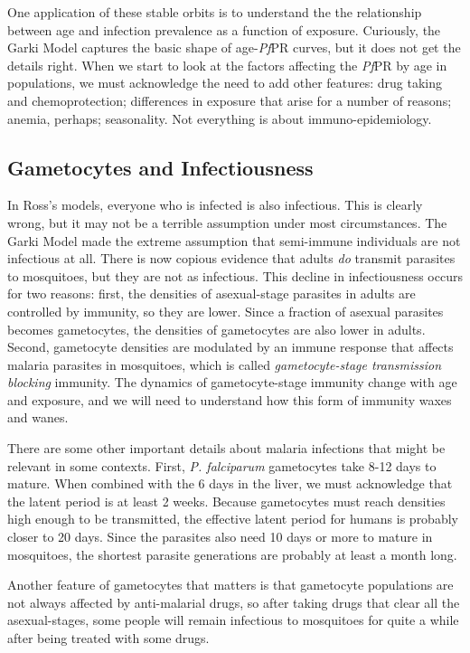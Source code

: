 \documentclass[
]{book}
\begin{document}
One application of these stable orbits is to understand the the relationship between age and infection prevalence as a function of exposure. Curiously, the Garki Model captures the basic shape of age-\emph{Pf}PR curves, but it does not get the details right. When we start to look at the factors affecting the \emph{Pf}PR by age in populations, we must acknowledge the need to add other features: drug taking and chemoprotection; differences in exposure that arise for a number of reasons; anemia, perhaps; seasonality. Not everything is about immuno-epidemiology.

\hypertarget{gametocytes-and-infectiousness}{%
\subsection{Gametocytes and Infectiousness}\label{gametocytes-and-infectiousness}}

In Ross's models, everyone who is infected is also infectious. This is clearly wrong, but it may not be a terrible assumption under most circumstances. The Garki Model made the extreme assumption that semi-immune individuals are not infectious at all. There is now copious evidence that adults \emph{do} transmit parasites to mosquitoes, but they are not as infectious. This decline in infectiousness occurs for two reasons: first, the densities of asexual-stage parasites in adults are controlled by immunity, so they are lower. Since a fraction of asexual parasites becomes gametocytes, the densities of gametocytes are also lower in adults. Second, gametocyte densities are modulated by an immune response that affects malaria parasites in mosquitoes, which is called \emph{gametocyte-stage transmission blocking} immunity. The dynamics of gametocyte-stage immunity change with age and exposure, and we will need to understand how this form of immunity waxes and wanes.

There are some other important details about malaria infections that might be relevant in some contexts. First, \emph{P. falciparum} gametocytes take 8-12 days to mature. When combined with the 6 days in the liver, we must acknowledge that the latent period is at least 2 weeks. Because gametocytes must reach densities high enough to be transmitted, the effective latent period for humans is probably closer to 20 days. Since the parasites also need 10 days or more to mature in mosquitoes, the shortest parasite generations are probably at least a month long.

Another feature of gametocytes that matters is that gametocyte populations are not always affected by anti-malarial drugs, so after taking drugs that clear all the asexual-stages, some people will remain infectious to mosquitoes for quite a while after being treated with some drugs.
\end{document}
